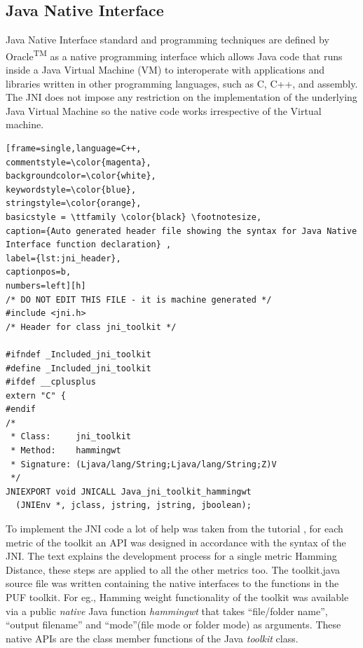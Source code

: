 \subsection{Java Native Interface}
Java Native Interface standard and programming techniques are defined by Oracle\textsuperscript{TM} as a native programming interface which allows Java code that runs inside a Java Virtual Machine (VM) to interoperate with applications and libraries written in other programming languages, such as C, C++, and assembly. The JNI does not impose any restriction on the implementation of the underlying Java Virtual Machine so the native code works irrespective of the Virtual machine.\\

\begin{lstlisting}[frame=single,language=C++,
commentstyle=\color{magenta},
backgroundcolor=\color{white},
keywordstyle=\color{blue},
stringstyle=\color{orange},
basicstyle = \ttfamily \color{black} \footnotesize,
caption={Auto generated header file showing the syntax for Java Native Interface function declaration} ,
label={lst:jni_header},
captionpos=b,
numbers=left][h]
/* DO NOT EDIT THIS FILE - it is machine generated */
#include <jni.h>
/* Header for class jni_toolkit */

#ifndef _Included_jni_toolkit
#define _Included_jni_toolkit
#ifdef __cplusplus
extern "C" {
#endif
/*
 * Class:     jni_toolkit
 * Method:    hammingwt
 * Signature: (Ljava/lang/String;Ljava/lang/String;Z)V
 */
JNIEXPORT void JNICALL Java_jni_toolkit_hammingwt
  (JNIEnv *, jclass, jstring, jstring, jboolean);
\end{lstlisting}
\vspace*{1\baselineskip}

To implement the JNI code a lot of help was taken from the tutorial \cite{jni_tutorial}, for each metric of the toolkit an API was designed in accordance with the syntax of the JNI. The text explains the development process for a single metric Hamming Distance, these steps are applied to all the other metrics too. The toolkit.java source file was written containing the native interfaces to the functions in the PUF toolkit. For eg., Hamming weight functionality of the toolkit was available via a
public \emph{native} Java function \emph{hammingwt} that takes ``file/folder name'', ``output filename'' and ``mode''(file mode or folder mode) as arguments.  These native APIs are the class member functions of the Java \emph{toolkit} class.\\

